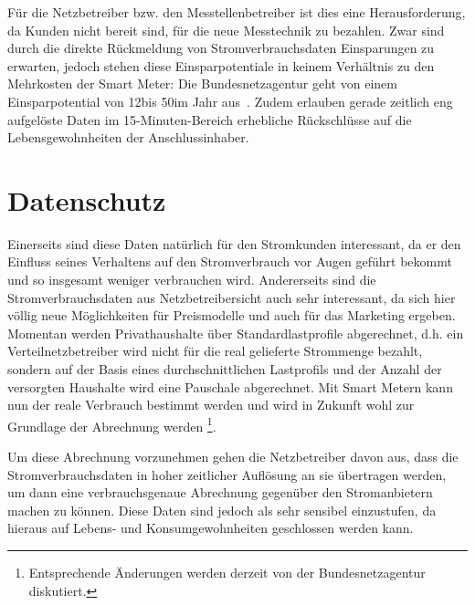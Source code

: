 \documentclass[logo]{fhgart}
\newcommand*\euro{\textup{\EUR}}
\begin{document}
Für die Netzbetreiber bzw. den Messtellenbetreiber ist dies eine
Herausforderung, da Kunden nicht bereit sind, für die neue Messtechnik
zu bezahlen. Zwar sind durch die direkte Rückmeldung von
Stromverbrauchsdaten Einsparungen zu erwarten,
jedoch stehen diese Einsparpotentiale in keinem Verhältnis zu
den Mehrkosten der Smart Meter: Die Bundesnetzagentur geht von einem
Einsparpotential von 12\euro bis 50\euro im Jahr
aus~\cite[S. 70]{bundesnetzagentur10handlungsoptionen}. Zudem erlauben gerade zeitlich eng
aufgelöste Daten im 15-Minuten-Bereich erhebliche Rückschlüsse auf die
Lebensgewohnheiten der Anschlussinhaber.


\section{Datenschutz}\label{sub:datenschutz}
Einerseits sind diese Daten natürlich für den Stromkunden interessant,
da er den Einfluss seines Verhaltens auf den Stromverbrauch vor Augen
geführt bekommt und so insgesamt weniger verbrauchen wird.  
Andererseits sind die Stromverbrauchsdaten aus Netzbetreibersicht auch
sehr interessant, da sich hier völlig neue Möglichkeiten für
Preismodelle und auch für das Marketing ergeben. Momentan werden
Privathaushalte über Standardlastprofile abgerechnet, d.h. ein
Verteilnetzbetreiber wird nicht für die real gelieferte Strommenge
bezahlt, sondern auf der Basis eines durchschnittlichen Lastprofils und
der Anzahl der versorgten Haushalte wird eine Pauschale abgerechnet. Mit
Smart Metern kann nun der reale Verbrauch bestimmt werden und wird in
Zukunft wohl zur Grundlage der Abrechnung werden \footnote{Entsprechende
Änderungen werden derzeit von der Bundesnetzagentur diskutiert.}. 

Um diese Abrechnung vorzunehmen gehen die Netzbetreiber davon aus, dass
die Stromverbrauchsdaten in hoher zeitlicher Auflösung an sie übertragen
werden, um dann eine verbrauchsgenaue Abrechnung gegenüber den
Stromanbietern machen zu können. Diese Daten sind jedoch als sehr
sensibel einzustufen, da hieraus auf Lebens- und Konsumgewohnheiten
geschlossen werden kann. 
\end{document}

